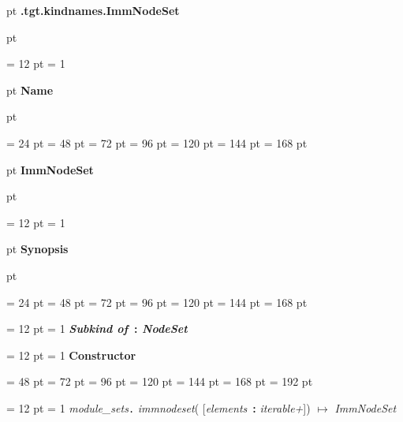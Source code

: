 {\par \pagebreak[3]  pt \noindent
{\LARGE {\bf .tgt.kindnames.ImmNodeSet\/}}\par {} pt
} \noindent
{\par \noindent
{\par \pagebreak[3.300000] \noindent \hangindent = 12 pt \hangafter = 1 
{\par \pagebreak[3]  pt \noindent
{\Large {\bf Name\/}}\par {} pt
} \noindent
\par}
{\par \noindent  \leftskip = 24 pt  \leftmargini = 48 pt  \leftmarginii = 72 pt  \leftmarginiii = 96 pt  \leftmarginiv = 120 pt  \leftmarginv = 144 pt  \leftmarginvi = 168 pt {\par \pagebreak[3]  pt \noindent
{\Large {\bf ImmNodeSet\/}}\par {} pt
} \noindent
\par}
{\par \pagebreak[3.300000] \noindent \hangindent = 12 pt \hangafter = 1 
{\par \pagebreak[3]  pt \noindent
{\Large {\bf Synopsis\/}}\par {} pt
} \noindent
\par}
{\par \noindent  \leftskip = 24 pt  \leftmargini = 48 pt  \leftmarginii = 72 pt  \leftmarginiii = 96 pt  \leftmarginiv = 120 pt  \leftmarginv = 144 pt  \leftmarginvi = 168 pt {\par \noindent
{\par \pagebreak[3.200000] \noindent \hangindent = 12 pt \hangafter = 1 
{\bf {\large {\bf  {\em Subkind of\/}~{\bf :}  {\em NodeSet\/}\/}}\/}\par}
{\par \pagebreak[3.200000] \noindent \hangindent = 12 pt \hangafter = 1 
{\large {\bf Constructor\/}}\par}
{\par \noindent  \leftskip = 48 pt  \leftmargini = 72 pt  \leftmarginii = 96 pt  \leftmarginiii = 120 pt  \leftmarginiv = 144 pt  \leftmarginv = 168 pt  \leftmarginvi = 192 pt {\par \noindent
{\par \pagebreak[3.100000] \noindent \hangindent = 12 pt \hangafter = 1 
 {\em module{\_}sets\/}{\large {\tt .\/} {\em immnodeset\/}}( {[}{\em elements\/}~{\bf :}  {\em iterable+\/}]) \(\mapsto \)  {\em ImmNodeSet\/}\par}
}}}}}

